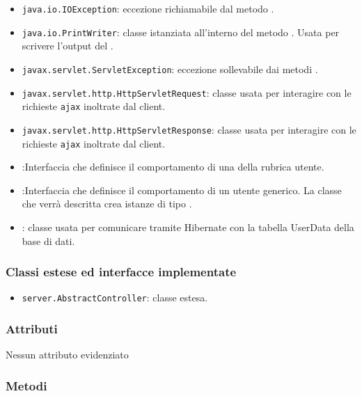 \begin{itemize}
	\item \texttt{java.io.IOException}: eccezione richiamabile dal metodo .
	\item \texttt{java.io.PrintWriter}: classe istanziata all'interno del metodo . Usata per scrivere l'output del .
	\item \texttt{javax.servlet.ServletException}: eccezione sollevabile dai metodi .
	\item \texttt{javax.servlet.http.HttpServletRequest}: classe usata per interagire con le richieste \texttt{ajax} inoltrate dal client.
	\item \texttt{javax.servlet.http.HttpServletResponse}: classe usata per interagire con le richieste \texttt{ajax} inoltrate dal client.
	\item {}:Interfaccia che definisce il comportamento di una  della rubrica utente.
	\item {}:Interfaccia che definisce il comportamento di un utente generico. La classe che verrà descritta crea istanze di tipo .
	\item {}: classe usata per comunicare tramite Hibernate con la tabella UserData della base di dati.
\end{itemize}

\subsubsection*{Classi estese ed interfacce implementate}
\begin{itemize}
	\item \texttt{server.AbstractController}: classe estesa.
\end{itemize}

\subsubsection*{Attributi}

Nessun attributo evidenziato

\subsubsection*{Metodi}

